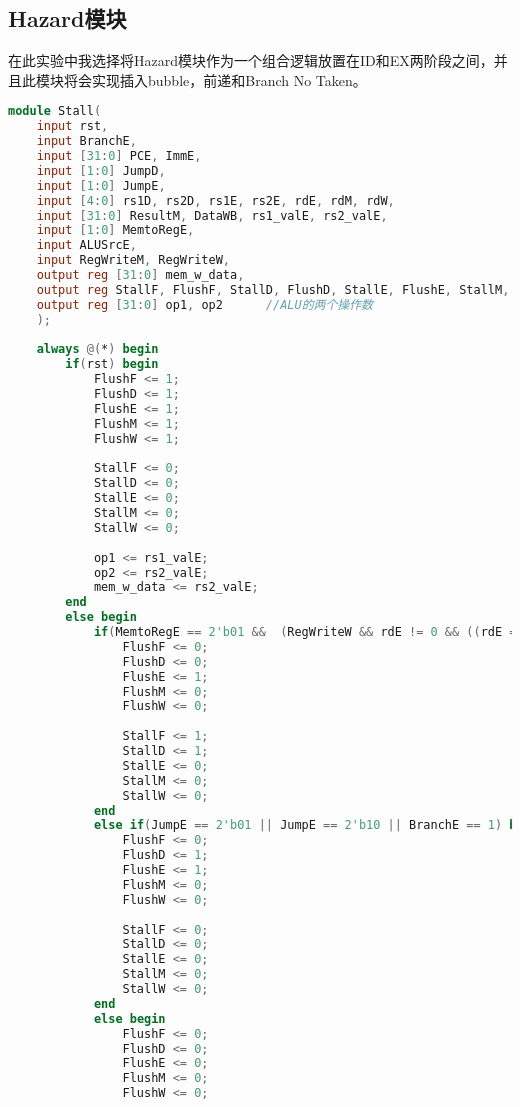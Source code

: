 \subsection{Hazard模块}
在此实验中我选择将Hazard模块作为一个组合逻辑放置在ID和EX两阶段之间，并且此模块将会实现插入bubble，前递和Branch No Taken。
\begin{lstlisting}[language = {verilog}]
module Stall(
    input rst,
    input BranchE,
    input [31:0] PCE, ImmE,
    input [1:0] JumpD,
    input [1:0] JumpE,
    input [4:0] rs1D, rs2D, rs1E, rs2E, rdE, rdM, rdW,
    input [31:0] ResultM, DataWB, rs1_valE, rs2_valE,
    input [1:0] MemtoRegE,
    input ALUSrcE,
    input RegWriteM, RegWriteW,
    output reg [31:0] mem_w_data,
    output reg StallF, FlushF, StallD, FlushD, StallE, FlushE, StallM, FlushM, StallW, FlushW,
    output reg [31:0] op1, op2      //ALU的两个操作数
    );
    
    always @(*) begin
        if(rst) begin
            FlushF <= 1;
            FlushD <= 1;
            FlushE <= 1;
            FlushM <= 1;
            FlushW <= 1;
            
            StallF <= 0;
            StallD <= 0;
            StallE <= 0;
            StallM <= 0;
            StallW <= 0;
            
            op1 <= rs1_valE;
            op2 <= rs2_valE;
            mem_w_data <= rs2_valE;
        end
        else begin
            if(MemtoRegE == 2'b01 &&  (RegWriteW && rdE != 0 && ((rdE == rs1D) || (rdE == rs2D))) ) begin //Load of RAW
                FlushF <= 0;
                FlushD <= 0;
                FlushE <= 1;
                FlushM <= 0;
                FlushW <= 0;
                
                StallF <= 1;
                StallD <= 1;
                StallE <= 0;
                StallM <= 0;
                StallW <= 0;                
            end
            else if(JumpE == 2'b01 || JumpE == 2'b10 || BranchE == 1) begin     //jal, jalr, Branch in EX
                FlushF <= 0;
                FlushD <= 1;
                FlushE <= 1;
                FlushM <= 0;
                FlushW <= 0;
                
                StallF <= 0;
                StallD <= 0;
                StallE <= 0;
                StallM <= 0;
                StallW <= 0;                
            end
            else begin
                FlushF <= 0;
                FlushD <= 0;
                FlushE <= 0;
                FlushM <= 0;
                FlushW <= 0;
                

\end{lstlisting}
